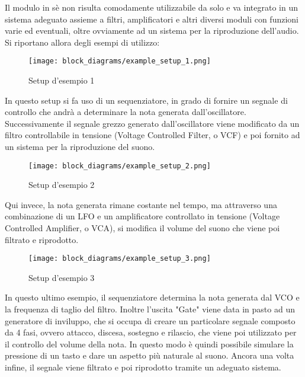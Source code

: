 
Il modulo in sè non risulta comodamente utilizzabile da solo e va integrato in un sistema
adeguato assieme a filtri, amplificatori e altri diversi moduli con funzioni varie ed eventuali,
oltre ovviamente ad un sistema per la riproduzione dell'audio. Si riportano allora degli
esempi di utilizzo:

\begin{figure}[H]
    \centering
    \texttt{[image: block\_diagrams/example\_setup\_1.png]}
    \caption{Setup d'esempio 1}
    \label{example_setup_1}
\end{figure}

In questo setup si fa uso di un sequenziatore, in grado di fornire un segnale di controllo
che andrà a determinare la nota generata dall'oscillatore. Successivamente il segnale grezzo
generato dall'oscillatore viene modificato da un filtro controllabile in tensione (Voltage
Controlled Filter, o VCF) e poi fornito ad un sistema per la riproduzione del suono.

\begin{figure}[H]
    \centering
    \texttt{[image: block\_diagrams/example\_setup\_2.png]}
    \caption{Setup d'esempio 2}
    \label{example_setup_2}
\end{figure}

Qui invece, la nota generata rimane costante nel tempo, ma attraverso una combinazione di un
LFO e un amplificatore controllato in tensione (Voltage Controlled Amplifier, o VCA), si
modifica il volume del suono che viene poi filtrato e riprodotto.

\begin{figure}[H]
    \centering
    \texttt{[image: block\_diagrams/example\_setup\_3.png]}
    \caption{Setup d'esempio 3}
    \label{example_setup_3}
\end{figure}

In questo ultimo esempio, il sequenziatore determina la nota generata dal VCO e la frequenza
di taglio del filtro. Inoltre l'uscita "Gate" viene data in pasto ad un generatore di inviluppo,
che si occupa di creare un particolare segnale composto da 4 fasi, ovvero attacco, discesa,
sostegno e rilascio, che viene poi utilizzato per il controllo del volume della nota.
In questo modo è quindi possibile simulare la pressione di un tasto e dare un aspetto più
naturale al suono. Ancora una volta infine, il segnale viene filtrato e poi riprodotto tramite
un adeguato sistema.

